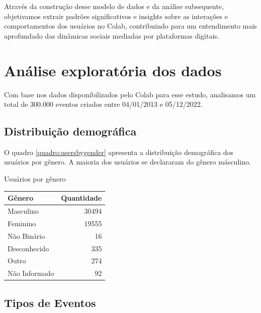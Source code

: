 Através da construção desse modelo de dados e da análise subsequente, objetivamos extrair padrões significativos e insights sobre as interações e comportamentos dos usuários no Colab, contribuindo para um entendimento mais aprofundado das dinâmicas sociais mediadas por plataformas digitais.

\section{Análise exploratória dos dados}
\label{sec:colab_data_analysis}

Com base nos dados disponibilizados pelo Colab para esse estudo, analisamos um total de 300.000 eventos criados entre 04/01/2013 e 05/12/2022.

\subsection*{Distribuição demográfica}

O quadro \autoref{quadro:usersbygender} apresenta a distribuição demográfica dos usuários por gênero. A maioria dos usuários se declararam do gênero másculino.

\begin{quadro}[htb]
	\caption{Usuários por gênero}
	\label{quadro:usersbygender}
	\centering
	\begin{tabular}{|l|r|}
		\hline
		\textbf{Gênero} & \textbf{Quantidade} \\
		\hline
		Masculino       & 30494               \\
		Feminino        & 19555               \\
		Não Binário     & 16                  \\
		Desconhecido    & 335                 \\
		Outro           & 274                 \\
		Não Informado   & 92                  \\
		\hline
	\end{tabular}
\end{quadro}

\subsection*{Tipos de Eventos}

